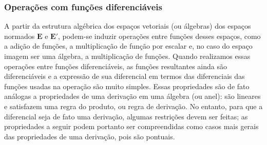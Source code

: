 \subsubsection{Operações com funções diferenciáveis}

A partir da estrutura algébrica dos espaços vetoriais (ou álgebras) dos espaços normados $\bm E$ e $\bm E'$, podem-se induzir operações entre funções desses espaços, como a adição de funções, a multiplicação de função por escalar e, no caso do espaço imagem ser uma álgebra, a multiplicação de funções. Quando realizamos essas operações entre funções diferenciáveis, as funções resultantes ainda são diferenciáveis e a expressão de sua diferencial em termos das diferenciais das funções usadas na operação são muito simples. Essas propriedades são de fato análogas a propriedades de uma derivação em uma álgebra (ou anel): são lineares e satisfazem uma regra do produto, ou regra de derivação. No entanto, para que a diferencial seja de fato uma derivação, algumas restrições devem ser feitas; as propriedades a seguir podem portanto ser compreendidas como casos mais gerais das propriedades de uma derivação, pois são pontuais.

